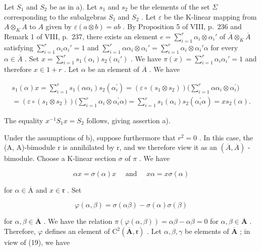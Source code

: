 Let \(S_{1}\) and \(S_{2}\) be as in a). Let \(s_{1}\) and \(s_{2}\) be the elements of the set \(\Sigma\) corresponding to the subalgebras \(S_{1}\) and \(S_{2}\) . Let \(\varepsilon\) be the K-linear mapping from \(A \otimes_{K} A\) to \(A\) given by \(\varepsilon(a \otimes b) = ab\) . By Proposition 5 of VIII, p.~236 and Remark 1 of VIII, p.~237, there exists an element \(e = \sum_{i=1}^{r} \alpha_{i} \otimes \alpha_{i}'\) of \(\overline{A} \otimes_{K} \overline{A}\) satisfying \(\sum_{i=1}^{r} \alpha_{i} \alpha_{i}' = 1\) and \(\sum_{i=1}^{r} \alpha \alpha_{i} \otimes \alpha_{i}' = \sum_{i=1}^{r} \alpha_{i} \otimes \alpha_{i}' \alpha\) for every \(\alpha \in \overline{A}\) . Set \(x = \sum_{i=1}^{r} s_{1}(\alpha_{i}) s_{2}(\alpha_{i}')\) . We have \(\pi(x) = \sum_{i=1}^{r} \alpha_{i} \alpha_{i}' = 1\) and therefore \(x \in 1 + r\) . Let \(\alpha\) be an element of \(\overline{A}\) . We have

\[
\begin{array}{l} s _ {1} (\alpha) x = \sum_ {i = 1} ^ {r} s _ {1} (\alpha \alpha_ {i}) s _ {2} (\alpha_ {i} ^ {\prime}) = (\varepsilon \circ (s _ {1} \otimes s _ {2})) \biggl (\sum_ {i = 1} ^ {r} \alpha \alpha_ {i} \otimes \alpha_ {i} ^ {\prime} \biggr) \\ = (\varepsilon \circ (s _ {1} \otimes s _ {2})) \biggl (\sum_ {i = 1} ^ {r} \alpha_ {i} \otimes \alpha_ {i} ^ {\prime} \alpha \biggr) = \sum_ {i = 1} ^ {r} s _ {1} (\alpha_ {i}) s _ {2} (\alpha_ {i} ^ {\prime} \alpha) = x s _ {2} (\alpha). \end{array}
\]

The equality \(x^{-1}S_{1}x = S_{2}\) follows, giving assertion a).

Under the assumptions of b), suppose furthermore that \(r^{2}=0\) . In this case, the (A, A)-bimodule r is annihilated by r, and we therefore view it as an \((\overline{A},\overline{A})\) -bimodule. Choose a K-linear section \(\sigma\) of \(\pi\) . We have

\[
\alpha x = \sigma (\alpha) x \quad \text { and } \quad x \alpha = x \sigma (\alpha)\tag{19}
\]

for \(\alpha \in \overline{\mathrm{A}}\) and \(x\in \mathfrak{r}\) . Set

\[
\varphi (\alpha , \beta) = \sigma (\alpha \beta) - \sigma (\alpha) \sigma (\beta)\tag{20}
\]

for \(\alpha, \beta \in \overline{\mathbf{A}}\) . We have the relation \(\pi(\varphi(\alpha, \beta)) = \alpha\beta - \alpha\beta = 0\) for \(\alpha, \beta \in \overline{\mathbf{A}}\) . Therefore, \(\varphi\) defines an element of \(\mathrm{C}^2(\overline{\mathbf{A}}, \mathfrak{r})\) . Let \(\alpha, \beta, \gamma\) be elements of \(\overline{\mathbf{A}}\) ; in view of (19), we have

